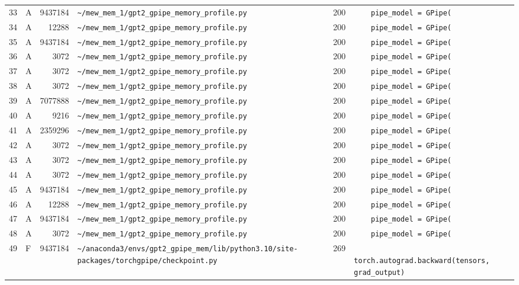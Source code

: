 \documentclass{article}
\begin{document}
\begin{longtable}{r l r p{6.5cm} r p{7.0cm}}
33 & A & 9437184 & \lstinline|~/mew_mem_1/gpt2_gpipe_memory_profile.py| & 200 & \lstinline|    pipe_model = GPipe(| \\
34 & A & 12288 & \lstinline|~/mew_mem_1/gpt2_gpipe_memory_profile.py| & 200 & \lstinline|    pipe_model = GPipe(| \\
35 & A & 9437184 & \lstinline|~/mew_mem_1/gpt2_gpipe_memory_profile.py| & 200 & \lstinline|    pipe_model = GPipe(| \\
36 & A & 3072 & \lstinline|~/mew_mem_1/gpt2_gpipe_memory_profile.py| & 200 & \lstinline|    pipe_model = GPipe(| \\
37 & A & 3072 & \lstinline|~/mew_mem_1/gpt2_gpipe_memory_profile.py| & 200 & \lstinline|    pipe_model = GPipe(| \\
38 & A & 3072 & \lstinline|~/mew_mem_1/gpt2_gpipe_memory_profile.py| & 200 & \lstinline|    pipe_model = GPipe(| \\
39 & A & 7077888 & \lstinline|~/mew_mem_1/gpt2_gpipe_memory_profile.py| & 200 & \lstinline|    pipe_model = GPipe(| \\
40 & A & 9216 & \lstinline|~/mew_mem_1/gpt2_gpipe_memory_profile.py| & 200 & \lstinline|    pipe_model = GPipe(| \\
41 & A & 2359296 & \lstinline|~/mew_mem_1/gpt2_gpipe_memory_profile.py| & 200 & \lstinline|    pipe_model = GPipe(| \\
42 & A & 3072 & \lstinline|~/mew_mem_1/gpt2_gpipe_memory_profile.py| & 200 & \lstinline|    pipe_model = GPipe(| \\
43 & A & 3072 & \lstinline|~/mew_mem_1/gpt2_gpipe_memory_profile.py| & 200 & \lstinline|    pipe_model = GPipe(| \\
44 & A & 3072 & \lstinline|~/mew_mem_1/gpt2_gpipe_memory_profile.py| & 200 & \lstinline|    pipe_model = GPipe(| \\
45 & A & 9437184 & \lstinline|~/mew_mem_1/gpt2_gpipe_memory_profile.py| & 200 & \lstinline|    pipe_model = GPipe(| \\
46 & A & 12288 & \lstinline|~/mew_mem_1/gpt2_gpipe_memory_profile.py| & 200 & \lstinline|    pipe_model = GPipe(| \\
47 & A & 9437184 & \lstinline|~/mew_mem_1/gpt2_gpipe_memory_profile.py| & 200 & \lstinline|    pipe_model = GPipe(| \\
48 & A & 3072 & \lstinline|~/mew_mem_1/gpt2_gpipe_memory_profile.py| & 200 & \lstinline|    pipe_model = GPipe(| \\
49 & F & 9437184 & \lstinline|~/anaconda3/envs/gpt2_gpipe_mem/lib/python3.10/site-packages/torchgpipe/checkpoint.py| & 269 & \lstinline|            torch.autograd.backward(tensors, grad_output)| \\

\end{longtable}
\end{document}
